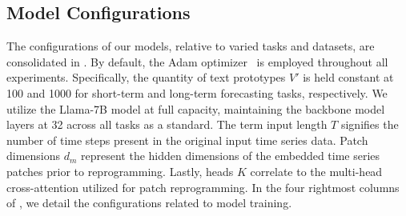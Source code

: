 \subsection{Model Configurations}\label{appx:model_config}
The configurations of our models, relative to varied tasks and datasets, are consolidated in . By default, the Adam optimizer~\citep{KingmaB14adam} is employed throughout all experiments. Specifically, the quantity of text prototypes $V'$ is held constant at 100 and 1000 for short-term and long-term forecasting tasks, respectively. We utilize the Llama-7B model at full capacity, maintaining the backbone model layers at 32 across all tasks as a standard. The term input length $T$ signifies the number of time steps present in the original input time series data. Patch dimensions $d_m$ represent the hidden dimensions of the embedded time series patches prior to reprogramming. Lastly, heads $K$ correlate to the multi-head cross-attention utilized for patch reprogramming. In the four rightmost columns of , we detail the configurations related to model training.

